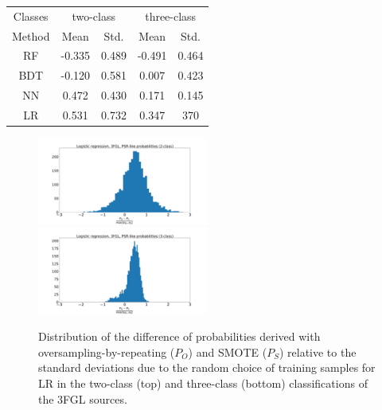 \documentclass[referee]{aa} %
\begin{document}
\begin{appendix}
\begin{table}[!h]
\begin{tabular}{c c c c c}
\hline
\hline
Classes&\multicolumn{2}{c}{two-class}&\multicolumn{2}{c}{three-class}\\
Method & Mean&Std.&Mean&Std.\\
\hline
RF& -0.335 & 0.489&-0.491&0.464\\
\hline
BDT&-0.120&0.581 &0.007&0.423\\
\hline
NN&0.472&0.430&0.171&0.145\\
\hline
LR&0.531&0.732&0.347&370\\
\end{tabular}
\vspace{2mm}
\end{table}
\begin{figure}[h!]
\centering
\includegraphics[width=0.5\textwidth]{plots/hist_diff_smote_LR_3FGL_2class.pdf}
\includegraphics[width=0.5\textwidth]{plots/hist_diff_smote_LR_3FGL_3class.pdf}
\caption{Distribution of the difference  of probabilities derived with oversampling-by-repeating ($P_O$) and SMOTE ($P_S$) 
relative to the standard deviations due to the random choice of training samples
for LR in the two-class (top) and three-class (bottom) classifications of the 3FGL sources.
}
\label{fig:OvsS_3FGL_PSR}
\end{figure}


\end{appendix}
\end{document}
